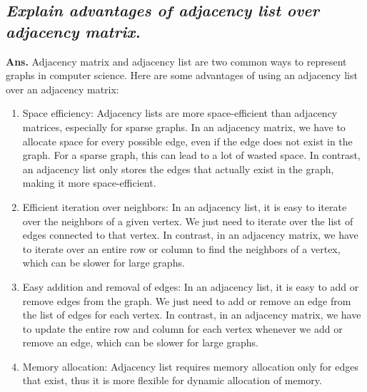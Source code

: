 \documentclass{article}
\begin{document}
\subsection{\textit{Explain advantages of adjacency list over adjacency matrix.}}
\textbf{Ans.} Adjacency matrix and adjacency list are two common ways to represent graphs in computer science. Here are some advantages of using an adjacency list over an adjacency matrix:
\begin{enumerate}
    \item Space efficiency: Adjacency lists are more space-efficient than adjacency matrices, especially for sparse graphs. In an adjacency matrix, we have to allocate space for every possible edge, even if the edge does not exist in the graph. For a sparse graph, this can lead to a lot of wasted space. In contrast, an adjacency list only stores the edges that actually exist in the graph, making it more space-efficient.
    \item Efficient iteration over neighbors: In an adjacency list, it is easy to iterate over the neighbors of a given vertex. We just need to iterate over the list of edges connected to that vertex. In contrast, in an adjacency matrix, we have to iterate over an entire row or column to find the neighbors of a vertex, which can be slower for large graphs.
    \item Easy addition and removal of edges: In an adjacency list, it is easy to add or remove edges from the graph. We just need to add or remove an edge from the list of edges for each vertex. In contrast, in an adjacency matrix, we have to update the entire row and column for each vertex whenever we add or remove an edge, which can be slower for large graphs.
    \item Memory allocation: Adjacency list requires memory allocation only for edges that exist, thus it is more flexible for dynamic allocation of memory.
\end{enumerate}
\pagebreak
\end{document}
